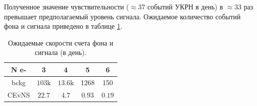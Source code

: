 Полученное значение чувствительности ($\approx$37 событий УКРН в день) в $\approx$33 раз превышает предполагаемый уровень сигнала. Ожидаемое количество событий фона и сигнала приведено в таблице \ref{cevnscount}.

\begin{table}[hbt]
    \centering
    \caption{Ожидаемые скорости счета фона и сигнала (в день).}
    
\begin{tabular}{|c|c|c|c|c|}
\hline N e- & 3 & 4 & 5 & 6 \\
\hline bckg & $103 \mathrm{k}$ & $13.6 \mathrm{k}$ & 1268 & 150 \\
\hline CEvNS & $22.7$ & $4.7$ & $0.93$ & $0.19$ \\
\hline
\end{tabular}
\label{cevnscount}
\end{table}
